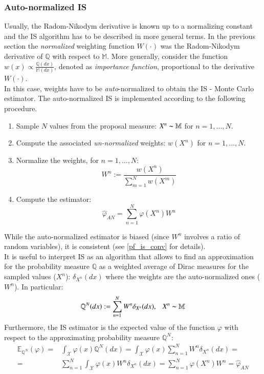 \documentclass[
]{book}
\theoremstyle{break}
\theoremstyle{nonumberplain}
\begin{document}
\subsubsection{Auto-normalized IS}

Usually, the Radom-Nikodym derivative is known up to a normalizing
constant and the IS algorithm has to be described in more general terms.
In the previous section the \textit{normalized} weighting function
\(W(\cdot)\) was the Radom-Nikodym derivative of \(\mathbb Q\) with
respect to \(\mathbb M\). More generally, consider the function
\(w(x)\propto\frac{\mathbb Q(dx)}{\mathbb M(dx)}\), denoted as
\textit{importance function}, proportional to the derivative
\(W(\cdot)\).\\
In this case, weights have to be \textit{auto}-normalized to obtain the
IS - Monte Carlo estimator. The auto-normalized IS is implemented
according to the following procedure.

\begin{enumerate}
    \item Sample $N$ values from the proposal measure: $X^n\thicksim \mathbb M$ for $n=1,...,N$.
    \item Compute the associated \textit{un-normalized} weights: $w(X^n)$ for $n=1,...,N$.
    \item Normalize the weights, for $n=1,...,N$:
    \begin{equation*}
        W^n:=\frac{w(X^n)}{\sum_{m=1}^Nw(X^m)}
    \end{equation*}
    \item Compute the estimator:
    \begin{equation*}
        \hat \varphi_{AN}=\sum_{n=1}^N\varphi (X^n)W^n
    \end{equation*}
\end{enumerate}

While the auto-normalized estimator is biased (since \(W^n\) involves a
ratio of random variables), it is consistent (see \ref{pf_is_conv} for
details). ~\\
It is useful to interpret IS as an algorithm that allows to find an
approximation for the probability measure \(\mathbb Q\) as a weighted
average of Dirac measures for the sampled values (\(X^n\)):
\(\delta_{X^n}(dx)\) where the weights are the auto-normalized ones
(\(W^n\)). In particular: \begin{equation}
    \mathbb Q^N(dx):=\sum_{n=1}^NW^n\delta_{X^n}(dx), ~~~X^n\thicksim \mathbb M
\end{equation} Furthermore, the IS estimator is the expected value of
the function \(\varphi\) with respect to the approximating probability
measure \(\mathbb Q^N\): \begin{equation*}
    \begin{split}
        \mathbb E_{\mathbb Q^N}(\varphi)=&\int_\mathcal X\varphi(x)\mathbb Q^N(dx)=\int_\mathcal X\varphi(x)\sum_{n=1}^NW^n\delta_{X^n}(dx)=\\
       = &\sum_{n=1}^N\int_\mathcal X\varphi(x)W^n\delta_{X^n}(dx)=\sum_{n=1}^N\varphi (X^n)W^n=\hat \varphi_{AN}
    \end{split}
\end{equation*}
\end{document}
